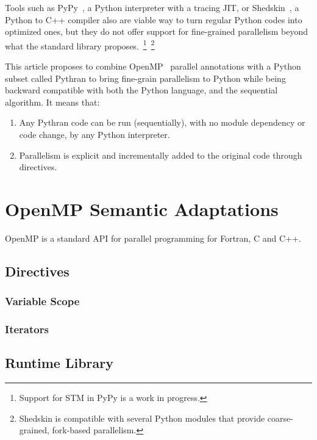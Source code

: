 \documentclass{llncs}
\begin{document}
Tools such as PyPy~\cite{pypy2009}, a Python interpreter with a tracing JIT, or
Shedskin~\cite{shedskin2006}, a Python to C++ compiler also are viable way to
turn regular Python codes into optimized ones, but they do not offer support for
fine-grained parallelism beyond what the standard library
proposes.~\footnote{Support for STM in PyPy is a work in
progress.}~\footnote{Shedskin is compatible with several Python modules that
provide coarse-grained, fork-based parallelism.}

This article proposes to combine OpenMP~\cite{openmp3.1} parallel annotations
with a Python subset called Pythran to bring fine-grain parallelism to Python
while being backward compatible with both the Python language, and the
sequential algorithm. It means that:
\begin{enumerate}
    \item Any Pythran code can be run (sequentially), with no module dependency or code change,
        by any Python interpreter.
    \item Parallelism is explicit and incrementally added to the original code
        through directives.
\end{enumerate}

\section{OpenMP Semantic Adaptations}\label{sec:python-openmp}

OpenMP is a standard API for parallel programming for Fortran, C and C++.

\subsection{Directives}

\subsubsection{Variable Scope}

\subsubsection{Iterators}

\subsection{Runtime Library}
\end{document}
